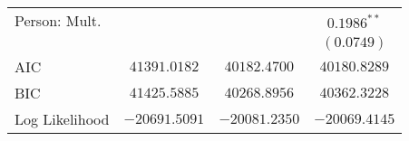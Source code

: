 \begin{center}
\begin{longtable}{l c c c}
Person: Mult.        &                 &                 & $0.1986^{**}$   \\
                     &                 &                 & $(0.0749)$      \\
\midrule
AIC                  & $41391.0182$    & $40182.4700$    & $40180.8289$    \\
BIC                  & $41425.5885$    & $40268.8956$    & $40362.3228$    \\
Log Likelihood       & $-20691.5091$   & $-20081.2350$   & $-20069.4145$   \\
\end{longtable}
\end{center}
